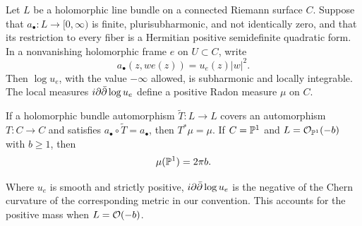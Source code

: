 \begin{lemma}
\label{lem:seminorm-curvature}
Let $L$ be a holomorphic line bundle on a connected Riemann surface $C$.
Suppose that $a_\bullet:L\to[0,\infty)$ is finite, plurisubharmonic, and
not identically zero, and that its restriction to every fiber is a
Hermitian positive semidefinite quadratic form.  In a nonvanishing
holomorphic frame $e$ on $U\subset C$, write
\[
 a_\bullet(z,w e(z))=u_e(z)|w|^2.
\]
Then $\log u_e$, with the value $-\infty$ allowed, is subharmonic and
locally integrable.  The local measures $i\partial\bar\partial\log u_e$ define a positive
Radon measure $\mu$ on $C$.

If a holomorphic bundle automorphism $\widetilde T:L\to L$ covers an
automorphism $T:C\to C$ and satisfies
$a_\bullet\circ\widetilde T=a_\bullet$, then $T^*\mu=\mu$.
If $C=\mathbb P^1$ and $L=\mathcal O_{\mathbb P^1}(-b)$ with $b\geq1$, then
\begin{equation}
 \label{eq:seminorm-curvature-mass}
 \mu(\mathbb P^1)=2\pi b.
\end{equation}
\end{lemma}

Where $u_e$ is smooth and strictly positive, $i\partial\bar\partial\log u_e$ is the
negative of the Chern curvature of the corresponding metric in our
convention.
This accounts for the positive mass when $L=\mathcal O(-b)$.

